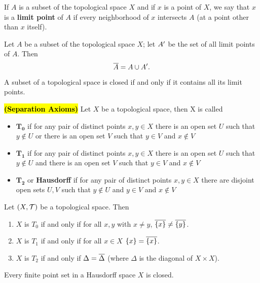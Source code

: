 \vs

\dfn If $A$ is a subset of the topological space $X$ and if $x$ is a point of $X$, we say that $x$ is a \textbf{limit point} of $A$ if every neighborhood of $x$ intersects $A$ (at a point other than $x$ itself).


\vs

\begin{thm}
Let $A$ be a subset of the topological space $X$; let $A^\prime$ be the set of all limit points of $A$. Then
\[\overline A = A\cup A^\prime.\]
\end{thm}

\vs

\begin{cor}
A subset of a topological space is closed if and only if it contains all its limit points.
\end{cor}

\vs

\dfn\textbf{\hl{(Separation Axioms)}} Let $X$ be a topological space, then X is called
\begin{itemize}
    \item $\boldsymbol{T_0}$ if for any pair of distinct points $x,y\in X$ there is an open set $U$ such that $y\nin U$ or there is an open set $V$ such that $y\in V$ and $x\nin V$
    \item $\boldsymbol{T_1}$ if for any pair of distinct points $x,y\in X$ there is an open set $U$ such that $y\nin U$ and there is an open set $V$ such that $y\in V$ and $x\nin V$
    \item $\boldsymbol{T_2}$ or \textbf{Hausdorff} if for any pair of distinct points $x,y\in X$ there are disjoint open sets $U, V$ such that $y\nin U$ and $y\in V$ and $x\nin V$
\end{itemize}

\vs

 Let $(X,\mathcal{T})$ be a topological space. Then 
\begin{enumerate}
    \item $X$ is $T_0$ if and only if for all $x,y$ with $x\neq y$, $\overline{\{x\}} \neq \overline{\{y\}}$.
    \item $X$ is $T_1$ if and only if for all $x\in X$ $\{x\} = \overline{\{x\}}$.
    \item $X$ is $T_2$ if and only if $\Delta = \overline \Delta$ (where $\Delta$ is the diagonal of $X\times X$).
\end{enumerate}


\vs

\begin{thm}
Every finite point set in a Hausdorff space $X$ is closed.
\end{thm}

